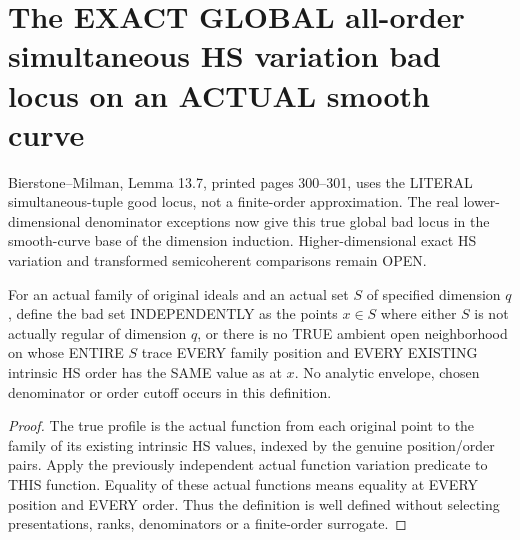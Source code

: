 \section{The EXACT GLOBAL all-order simultaneous HS variation bad locus on an ACTUAL smooth curve}

Bierstone--Milman\cite{bierstone-milman97-invent-math}, Lemma 13.7,
printed pages 300--301, uses the LITERAL simultaneous-tuple good locus,
not a finite-order approximation. The real lower-dimensional denominator
exceptions now give this true global bad locus in the smooth-curve base
of the dimension induction. Higher-dimensional exact HS variation and
transformed semicoherent comparisons remain OPEN.

\begin{definition}
\label{hir:actual-simultaneous-all-order-hs-variation-definition}
\leanok
For an actual family of original ideals and an actual set $S$ of specified
dimension $q$, define the bad set INDEPENDENTLY as the points $x\in S$
where either $S$ is not actually regular of dimension $q$, or there is no
TRUE ambient open neighborhood on whose ENTIRE $S$ trace EVERY family
position and EVERY EXISTING intrinsic HS order has the SAME value as at $x$.
No analytic envelope, chosen denominator or order cutoff occurs in this
definition.
\end{definition}
\begin{proof}
The true profile is the actual function from each original point to the
family of its existing intrinsic HS values, indexed by the genuine
position/order pairs. Apply the previously independent actual function
variation predicate to THIS function. Equality of these actual functions
means equality at EVERY position and EVERY order. Thus the definition is
well defined without selecting presentations, ranks, denominators or a
finite-order surrogate.
\end{proof}

